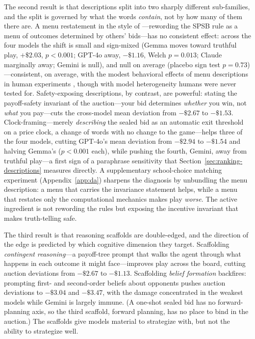 The second result is that descriptions split into two sharply different sub-families, and the split is governed by what the words \emph{contain}, not by how many of them there are. A menu restatement in the style of \citet{gonczarowski2023strategyproofness}---rewording the SPSB rule as a menu of outcomes determined by others' bids---has no consistent effect: across the four models the shift is small and sign-mixed (Gemma moves toward truthful play, $+\$2.03$, $p<0.001$; GPT-4o away, $-\$1.16$, Welch $p=0.013$; Claude marginally away; Gemini is null), and null on average (placebo sign test $p=0.73$)---consistent, on average, with the modest behavioral effects of menu descriptions in human experiments \citep{gonczarowski2024describing}, though with model heterogeneity humans were never tested for. Safety-exposing descriptions, by contrast, are powerful: stating the payoff-safety invariant of the auction---your bid determines \emph{whether} you win, not \emph{what} you pay---cuts the cross-model mean deviation from $-\$2.67$ to $-\$1.53$. Clock-framing---merely \emph{describing} the sealed bid as an automatic exit threshold on a price clock, a change of words with no change to the game---helps three of the four models, cutting GPT-4o's mean deviation from $-\$2.94$ to $-\$1.54$ and halving Gemma's ($p<0.001$ each), while pushing the fourth, Gemini, away from truthful play---a first sign of a paraphrase sensitivity that Section~\ref{sec:ranking-descriptions} measures directly. A supplementary school-choice matching experiment (Appendix~\ref{app:da}) sharpens the diagnosis by unbundling the menu description: a menu that carries the invariance statement helps, while a menu that restates only the computational mechanics makes play \emph{worse}. The active ingredient is not rewording the rules but exposing the incentive invariant that makes truth-telling safe.

The third result is that reasoning scaffolds are double-edged, and the direction of the edge is predicted by which cognitive dimension they target. Scaffolding \emph{contingent reasoning}---a payoff-tree prompt that walks the agent through what happens in each outcome it might face---improves play across the board, cutting auction deviations from $-\$2.67$ to $-\$1.13$. Scaffolding \emph{belief formation} backfires: prompting first- and second-order beliefs about opponents pushes auction deviations to $-\$3.04$ and $-\$3.47$, with the damage concentrated in the weakest models while Gemini is largely immune. (A one-shot sealed bid has no forward-planning axis, so the third scaffold, forward planning, has no place to bind in the auction.) The scaffolds give models material to strategize with, but not the ability to strategize well.

